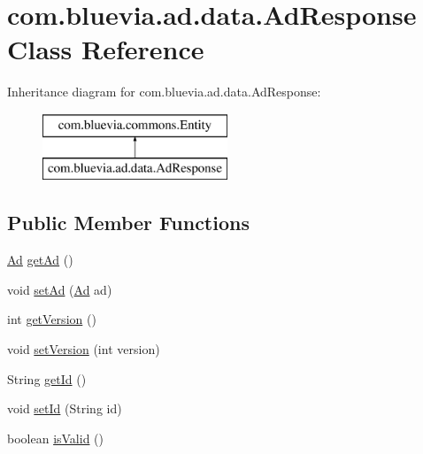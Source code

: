 \hypertarget{classcom_1_1bluevia_1_1ad_1_1data_1_1AdResponse}{
\section{com.bluevia.ad.data.AdResponse Class Reference}
\label{classcom_1_1bluevia_1_1ad_1_1data_1_1AdResponse}
}
Inheritance diagram for com.bluevia.ad.data.AdResponse:\begin{figure}[H]
\begin{center}
\leavevmode
\includegraphics[height=2.000000cm]{classcom_1_1bluevia_1_1ad_1_1data_1_1AdResponse}
\end{center}
\end{figure}
\subsection*{Public Member Functions}
\begin{DoxyCompactItemize}
\item 
\hyperlink{classcom_1_1bluevia_1_1ad_1_1data_1_1Ad}{Ad} \hyperlink{classcom_1_1bluevia_1_1ad_1_1data_1_1AdResponse_a581d85bc918aabb337a6b876ddc7eacc}{getAd} ()
\item 
void \hyperlink{classcom_1_1bluevia_1_1ad_1_1data_1_1AdResponse_aab9d148d07bca103b70dc4e492c46d57}{setAd} (\hyperlink{classcom_1_1bluevia_1_1ad_1_1data_1_1Ad}{Ad} ad)
\item 
int \hyperlink{classcom_1_1bluevia_1_1ad_1_1data_1_1AdResponse_a172d52c3592d57980bae31d24ef142e5}{getVersion} ()
\item 
void \hyperlink{classcom_1_1bluevia_1_1ad_1_1data_1_1AdResponse_a53d86b605fb08a1c92c2a1999284d303}{setVersion} (int version)
\item 
String \hyperlink{classcom_1_1bluevia_1_1ad_1_1data_1_1AdResponse_a799e62103cdd8fd42b5c997b6cbf2706}{getId} ()
\item 
void \hyperlink{classcom_1_1bluevia_1_1ad_1_1data_1_1AdResponse_a3278eb4bce1f55f2511bb58c2ba5b98f}{setId} (String id)
\item 
boolean \hyperlink{classcom_1_1bluevia_1_1ad_1_1data_1_1AdResponse_a15abd5809fbfb5145b7b42d3804b9fae}{isValid} ()
\end{DoxyCompactItemize}


